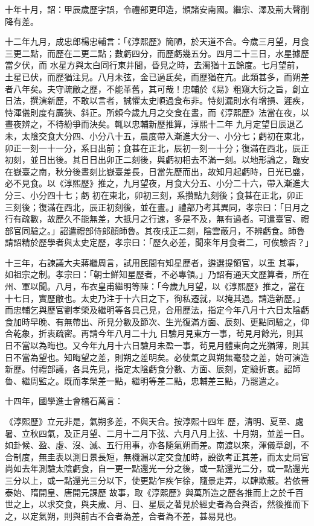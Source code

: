 \begin{pinyinscope}
 十年十月，詔：甲辰歲歷字誤，令禮部更印造，頒諸安南國。繼宗、澤及荊大聲削降有差。



 十二年九月，成忠郎楊忠輔言：「《淳熙歷》簡陋，於天道不合。今歲三月望，月食三更二點，而歷在二更二點；數虧四分，而歷虧幾五分。四月二十三日，水星據歷當夕伏，而
 水星方與太白同行東井間，昏見之時，去濁猶十五餘度。七月望前，土星已伏，而歷猶注見。八月未弦，金已過氐矣，而歷猶在亢。此類甚多，而朔差者八年矣。夫守疏敝之歷，不能革舊，其可哉！忠輔於《易》粗窺大衍之旨，創立日法，撰演新歷，不敢以言者，誠懼太史順過食布非。恃刻漏則水有增損、遲疾，恃渾儀則度有廣狹、斜正。所賴今歲九月之交食在晝，而《淳熙歷》法當在夜，以晝夜辨之，不待紛爭而決矣。輒以忠輔新歷推算，淳熙十二年
 九月定望日辰退乙未，太陰交食大分四、小分八十五，晨度帶入漸進大分一、小分七；虧初在東北，卯正一刻一十一分，系日出前；食甚在正北，辰初一刻一十分；復滿在西北，辰正初刻，並日出後。其日日出卯正二刻後，與虧初相去不滿一刻。以地形論之，臨安在嶽臺之南，秋分後晝刻比嶽臺差長，日當先歷而出，故知月起虧時，日光已盛，必不見食。以《淳熙歷》推之，九月望夜，月食大分五、小分二十六，帶入漸進大分三、小分四十七；虧
 初在東北，卯初三刻，系攢點九刻後；食甚在正北，卯正三刻後；復滿在西北，辰正初刻後，並在晝。」禮部乃考其異同，孝宗曰：「日月之行有疏數，故歷久不能無差，大抵月之行速，多是不及，無有過者。可遣臺官、禮部官同驗之。」詔遣禮部侍郎顏師魯。其夜戌正二刻，陰雲蔽月，不辨虧食。師魯請詔精於歷學者與太史定歷，孝宗曰：「歷久必差，聞來年月食者二，可俟驗否？」



 十三年，右諫議大夫蔣繼周言，試用民間有知星歷者，遴選提領官，以重
 其事，如祖宗之制。孝宗曰：「朝士鮮知星歷者，不必專領。」乃詔有通天文歷算者，所在州、軍以聞。八月，布衣皇甫繼明等陳：「今歲九月望，以《淳熙歷》推之，當在十七日，實歷敝也。太史乃注于十六日之下，徇私遷就，以掩其過。請造新歷。」而忠輔乞與歷官劉孝榮及繼明等各具己見，合用歷法，指定今年八月十六日太陰虧食加時早晚、有無帶出、所見分數及節次、生光復滿方面、辰刻、更點同驗之，仰合乾象，折衷疏密。再請今年八月二十九
 日驗月見東方一事，茍見月餘光，則其日不當以為晦也。又今年九月十六日驗月未盈一事，茍見月體東向之光猶薄，則其日不當為望也。知晦望之差，則朔之差明矣。必使氣之與朔無毫發之差，始可演造新歷。付禮部議，各具先見，指定太陰虧食分數、方面、辰刻，定驗折衷。詔師魯、繼周監之。既而孝榮差一點，繼明等差二點，忠輔差三點，乃罷遣之。



 十四年，國學進士會稽石萬言：



 《淳熙歷》立元非是，氣朔多差，不與天合。按淳熙十四年
 歷，清明、夏至、處暑、立秋四氣，及正月望、二月十二月下弦、六月八月上弦、十月朔，並差一日。如卦候、盈、虛、沒、滅、五行用事，亦各隨氣朔而差。南渡以來，渾儀草創，不合制度，無圭表以測日景長短，無機漏以定交食加時，設欲考正其差，而太史局官尚如去年測驗太陰虧食，自一更一點還光一分之後，或一點還光二分，或一點還光三分以上，或一點還光三分以下，使更點乍疾乍徐，隨景走弄，以肆欺蔽。若依晉泰始、隋開皇、唐開元課歷
 故事，取《淳熙歷》與萬所造之歷各推而上之於千百世之上，以求交食，與夫歲、月、日、星辰之著見於經史者為合與否，然後推而下之，以定氣朔，則與前古不合者為差，合者為不差，甚易見也。




\end{pinyinscope}
